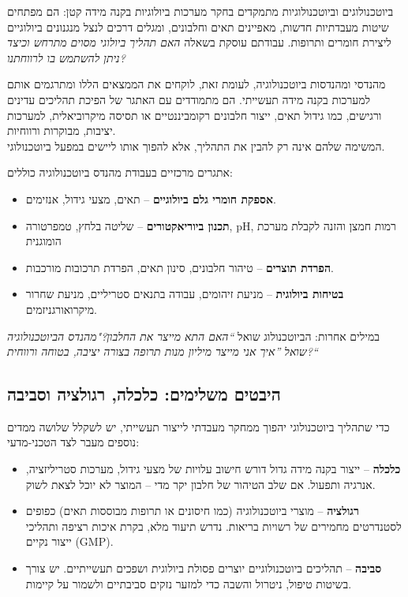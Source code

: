 \documentclass[
  hebrew,
  letterpaper,
  DIV=11,
  numbers=noendperiod]{scrreprt}
\begin{document}
{ביוטכנולוגים וביוטכנולוגיות מתמקדים בחקר מערכות ביולוגיות בקנה מידה
קטן: הם מפתחים שיטות מעבדתיות חדשות, מאפיינים תאים וחלבונים, ומגלים
דרכים לנצל מנגנונים ביולוגיים ליצירת חומרים ותרופות. עבודתם עוסקת בשאלה
\emph{האם תהליך ביולוגי מסוים מתרחש וכיצד ניתן להשתמש בו
לרווחתנו}}\emph{?}

{מהנדסי ומהנדסות ביוטכנולוגיה, לעומת זאת, לוקחים את הממצאים הללו
ומתרגמים אותם למערכות בקנה מידה תעשייתי. הם מתמודדים עם האתגר של הפיכת
תהליכים עדינים ורגישים, כמו גידול תאים, ייצור חלבונים רקומביננטיים או
תסיסה מיקרוביאלית, למערכות יציבות, מבוקרות ורווחיות}.\\
{המשימה שלהם אינה רק להבין את התהליך, אלא להפוך אותו ליישים במפעל
ביוטכנולוגי}.

{אתגרים מרכזיים בעבודת מהנדס ביוטכנולוגיה כוללים}:

\begin{itemize}
\item
  {\textbf{אספקת חומרי גלם ביולוגיים}} -- {תאים, מצעי גידול, אנזימים}.
\item
  {\textbf{תכנון ביוריאקטורים}} -- {שליטה בלחץ, טמפרטורה}, pH, {רמות
  חמצן והזנה לקבלת מערכת הומוגנית}
\item
  {\textbf{הפרדת תוצרים}} -- {טיהור חלבונים, סינון תאים, הפרדת תרכובות
  מורכבות}.
\item
  {\textbf{בטיחות ביולוגית}} -- {מניעת זיהומים, עבודה בתנאים סטריליים,
  מניעת שחרור מיקרואורגניזמים}.
\end{itemize}

{במילים אחרות: הביוטכנולוג שואל} \emph{``{האם התא מייצר את
החלבון?"}\emph{{מהנדס הביוטכנולוגיה שואל} }''{איך אני מייצר מיליון מנות
תרופה בצורה יציבה, בטוחה ורווחית}?{}``}

\subsection{\texorpdfstring{{היבטים משלימים: כלכלה, רגולציה
וסביבה}}{היבטים משלימים: כלכלה, רגולציה וסביבה}}\label{ux5d4ux5d9ux5d1ux5d8ux5d9ux5dd-ux5deux5e9ux5dcux5d9ux5deux5d9ux5dd-ux5dbux5dcux5dbux5dcux5d4-ux5e8ux5d2ux5d5ux5dcux5e6ux5d9ux5d4-ux5d5ux5e1ux5d1ux5d9ux5d1ux5d4}

{כדי שתהליך ביוטכנולוגי יהפוך ממחקר מעבדתי לייצור תעשייתי, יש לשקלל
שלושה ממדים נוספים מעבר לצד הטכני-מדעי}:

\begin{itemize}
\item
  {\textbf{כלכלה}} -- {ייצור בקנה מידה גדול דורש חישוב עלויות של מצעי
  גידול, מערכות סטריליזציה, אנרגיה ותפעול. אם שלב הטיהור של חלבון יקר
  מדי -- המוצר לא יוכל לצאת לשוק}.
\item
  {\textbf{רגולציה}} -- {מוצרי ביוטכנולוגיה (כמו חיסונים או תרופות
  מבוססות תאים) כפופים לסטנדרטים מחמירים של רשויות בריאות. נדרש תיעוד
  מלא, בקרת איכות רציפה ותהליכי ייצור נקיים} (GMP).
\item
  {\textbf{סביבה}} -- {תהליכים ביוטכנולוגיים יוצרים פסולת ביולוגית
  ושפכים תעשייתיים. יש צורך בשיטות טיפול, ניטרול והשבה כדי למזער נזקים
  סביבתיים ולשמור על קיימות}.
\end{itemize}
\end{document}

